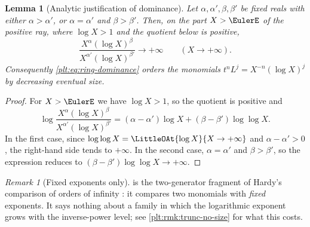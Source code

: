 \documentclass[11pt,oneside]{article}
\theoremstyle{plain}
\newtheorem{lemma}[theorem]{Lemma}
\theoremstyle{definition}
\theoremstyle{remark}
\newtheorem{remark}[theorem]{Remark}
\begin{document}
\begin{lemma}[Analytic justification of dominance]
\label{plt:lem:ring-dominance-analytic}
Let \(\alpha,\alpha',\beta,\beta'\) be fixed reals with either
\(\alpha>\alpha'\), or \(\alpha=\alpha'\) and \(\beta>\beta'\).  Then, on the
part \(X>\EulerE\) of the positive ray, where \(\log X>1\) and the quotient
below is positive,
\[
  \frac{X^{\alpha}(\log X)^{\beta}}{X^{\alpha'}(\log X)^{\beta'}}
  \longrightarrow+\infty
  \qquad(X\to+\infty).
\]
Consequently \eqref{plt:eq:ring-dominance} orders the monomials
\(t^nL^j=X^{-n}(\log X)^j\) by decreasing eventual size.
\end{lemma}

\begin{proof}
For \(X>\EulerE\) we have \(\log X>1\), so the quotient is positive and
\[
  \log\frac{X^{\alpha}(\log X)^{\beta}}{X^{\alpha'}(\log X)^{\beta'}}
  =(\alpha-\alpha')\log X+(\beta-\beta')\log\log X .
\]
In the first case, since \(\log\log X=\LittleOAt{\log X}{X\to+\infty}\) and
\(\alpha-\alpha'>0\), the right-hand side tends to \(+\infty\).  In the second
case, \(\alpha=\alpha'\) and \(\beta>\beta'\), so the expression reduces to
\((\beta-\beta')\log\log X\to+\infty\).
\end{proof}

\begin{remark}[Fixed exponents only]
\label{plt:rmk:ring-fixed-exponents}
 is the two-generator fragment of
Hardy's comparison of orders of infinity \cite{hardy-orders}: it compares two
monomials with \emph{fixed} exponents.  It says nothing about a family in which the
logarithmic exponent grows with the inverse-power level; see
\cref{plt:rmk:trunc-no-size} for what this costs.
\end{remark}
\end{document}

